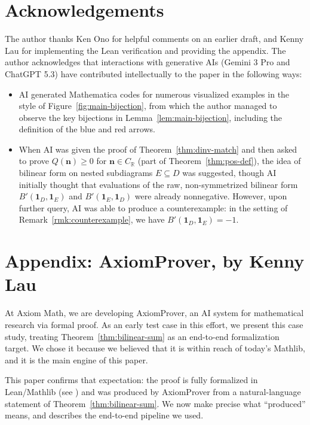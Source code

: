 \documentclass[11pt,reqno]{amsart}
\theoremstyle{remark}
\begin{document}
\section{Acknowledgements}\label{sec:ack}
The author thanks Ken Ono for helpful comments on an earlier draft, and Kenny Lau for implementing the Lean verification and providing the appendix. The author acknowledges that interactions with generative AIs (Gemini 3 Pro and ChatGPT 5.3) have contributed intellectually to the paper in the following ways:
\begin{itemize}
    \item AI generated Mathematica codes for numerous visualized examples in the style of Figure~\ref{fig:main-bijection}, from which the author managed to observe the key bijections in Lemma~\ref{lem:main-bijection}, including the definition of the blue and red arrows.
    \item When AI was given the proof of Theorem~\ref{thm:dinv-match} and then asked to prove $Q(\mathbf{n})\geq 0$ for $\mathbf{n}\in C_\mathbb{R}$ (part of Theorem~\ref{thm:pos-def}), the idea of bilinear form on nested subdiagrams $E\subseteq D$ was suggested, though AI initially thought that evaluations of the raw, non-symmetrized bilinear form $B'(\mathbf{1}_D,\mathbf{1}_E)$ and $B'(\mathbf{1}_E,\mathbf{1}_D)$ were already nonnegative. However, upon further query, AI was able to produce a counterexample: in the setting of Remark~\ref{rmk:counterexample}, we have $B'(\mathbf{1}_D,\mathbf{1}_E)=-1$.
\end{itemize}

\section{Appendix: AxiomProver, by Kenny Lau}\label{sec:AxiomProver}
At Axiom Math, we are developing AxiomProver, an AI system for mathematical research via formal proof.
As an early test case in this effort, we present this case study,
treating Theorem~\ref{thm:bilinear-sum} as an end-to-end formalization target.
We chose it because we believed that it is within reach of today's Mathlib, and it is the main engine of this paper.

This paper confirms that expectation: the proof is fully formalized in Lean/Mathlib
(see \cite{Lean,Mathlib2020})
and was produced by AxiomProver from a natural-language statement
of Theorem~\ref{thm:bilinear-sum}.
We now make precise what ``produced'' means, and describes the end-to-end pipeline we used.
\end{document}

